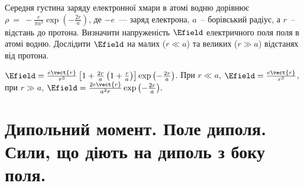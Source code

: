 \begin{problem}
Середня густина заряду електронної хмари в атомі водню дорівнює $\rho~=~-\frac{e}{\pi a^3}\exp{\left( -\frac{2r}{a}\right) }$, де $-e$~--- заряд електрона, $a$~-- борівський радіус, а $r$~-- відстань до протона. Визначити напруженість $\Efield$ електричного поля поля в атомі водню. Дослідити $\Efield$ на малих ($r\ll a$) та  великих ($r \gg a$) відстанях від протона.
\begin{solution}
	$\Efield = \frac{e\vect{r}}{r^3} \left[ 1 + \frac{2r}{a} \left( 1 + \frac{r}{a} \right) \right]\exp{\left( -\frac{2r}{a}\right) }$. При $r\ll a$, $\Efield = \frac{e\vect{r}}{r^3}$, при $r \gg a$, $\Efield = \frac{2e\vect{r}}{a^2r}\exp{\left( -\frac{2r}{a}\right) }.$
\end{solution}
\end{problem}

\section{Дипольний момент. Поле диполя. Сили, що діють на диполь з боку поля.}

